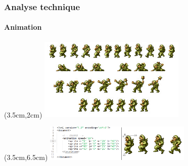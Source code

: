 \begin{frame}

	\frametitle{Analyse technique}
	\framesubtitle{Animation}

	\begin{textblock*}{7cm}(3.5cm,2cm)
		\includegraphics[width=7cm]{figures/partie_feuille_sprite.jpg}
	\end{textblock*}

	\begin{textblock*}{7cm}(3.5cm,6.5cm)
		\includegraphics[width=7cm]{figures/xml_anim.png}
	\end{textblock*}

\end{frame}
